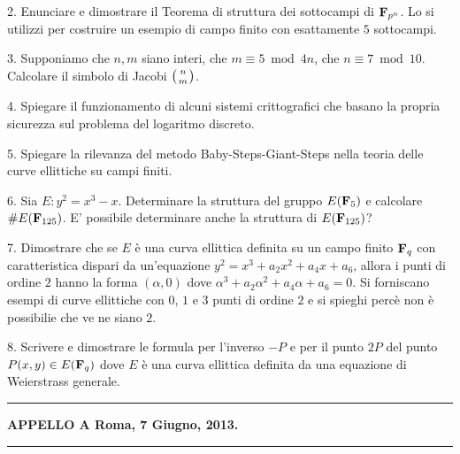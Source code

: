 \item{2.} Enunciare e dimostrare il Teorema di struttura dei sottocampi di ${\bf F}_{p^n}$. Lo si utilizzi per costruire
un esempio di campo finito con esattamente $5$ sottocampi.
\item{3.} Supponiamo che $n,m$ siano interi, che $m\equiv 5\bmod 4n$, che $n\equiv7\bmod10$. Calcolare il simbolo di
Jacobi $\left({n\atop m}\right)$.
\item{4.} Spiegare il funzionamento di alcuni sistemi crittografici che basano la propria sicurezza sul problema del 
logaritmo discreto.
\item{5.} Spiegare la rilevanza del metodo Baby-Steps-Giant-Steps nella teoria delle curve ellittiche su campi finiti.
\item{6.} Sia $E: y^2=x^3-x$. Determinare la struttura del gruppo $E({\bf F}_5)$  e calcolare $\#E({\bf F}_{125})$. E' possibile
determinare anche la struttura di $E({\bf F}_{125})$?
\item{7.} Dimostrare che se $E$ \`e una curva ellittica definita su un campo finito ${\bf F}_q$
con caratteristica dispari da un'equazione $y^2=x^3+a_2x^2+a_4x+a_6$, allora i punti di ordine $2$ hanno la forma $(\alpha,0)$
dove $\alpha^3+a_2\alpha^2+a_4\alpha+a_6=0$. Si forniscano esempi di curve ellittiche con $0$, $1$ e $3$ punti di ordine $2$ e
si spieghi perc\`e non \`e possibilie che ve ne siano $2$.
\item{8.} Scrivere e dimostrare le formula per l'inverso $-P$ e per il punto $2P$ del punto $P(x,y)\in E({\bf F}_q)$ dove
$E$ \`e una curva ellittica definita da una equazione di Weierstrass generale.
\bigskip
\bigskip\hrule\bigskip
\centerline{{\bf APPELLO A \hfill Roma, 7 Giugno, 2013.}}\bigskip\hrule\bigskip

